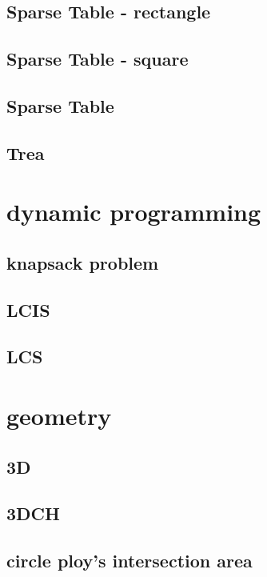 \documentclass[a4paper,5pt,titlepage]{article}
\begin{document}
\subsection{Sparse Table - rectangle}

\subsection{Sparse Table - square}

\subsection{Sparse Table}

\subsection{Trea}

\section{dynamic programming}
\subsection{knapsack problem}

\subsection{LCIS}

\subsection{LCS}

\section{geometry}
\subsection{3D}

\subsection{3DCH}

\subsection{circle ploy's intersection area}

\end{document}
